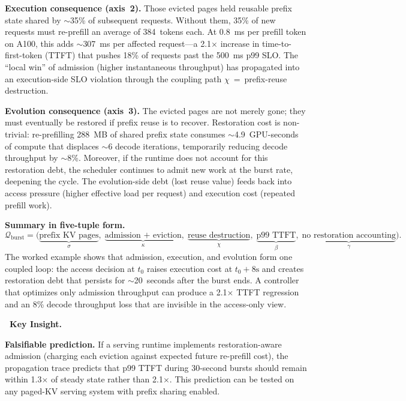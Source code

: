 \documentclass[acmsmall,screen,review]{acmart}
\newenvironment{keybox}{%
  \vspace{6pt}\noindent
  \begin{lrbox}{\keyboxcontent}
  \begin{minipage}{\dimexpr\linewidth-2\fboxsep-2\fboxrule\relax}
  \raggedright
  \textbf{\faLightbulbO\ \textcolor{keyborder}{Key Insight.}}\par\smallskip
}{%
  \end{minipage}
  \end{lrbox}
  \fcolorbox{keyborder}{keybg}{\usebox{\keyboxcontent}}%
  \vspace{6pt}%
}
\begin{document}
\smallskip\noindent\textbf{Execution consequence (axis~2).} Those evicted pages held reusable prefix state shared by $\sim$35\% of subsequent requests. Without them, 35\% of new requests must re-prefill an average of 384~tokens each. At 0.8~ms per prefill token on A100, this adds $\sim$307~ms per affected request---a 2.1$\times$ increase in time-to-first-token (TTFT) that pushes 18\% of requests past the 500~ms p99 SLO. The ``local win'' of admission (higher instantaneous throughput) has propagated into an execution-side SLO violation through the coupling path $\chi$~=~prefix-reuse destruction.

\smallskip\noindent\textbf{Evolution consequence (axis~3).} The evicted pages are not merely gone; they must eventually be restored if prefix reuse is to recover. Restoration cost is non-trivial: re-prefilling 288~MB of shared prefix state consumes $\sim$4.9~GPU-seconds of compute that displaces $\sim$6 decode iterations, temporarily reducing decode throughput by $\sim$8\%. Moreover, if the runtime does not account for this restoration debt, the scheduler continues to admit new work at the burst rate, deepening the cycle. The evolution-side debt (lost reuse value) feeds back into access pressure (higher effective load per request) and execution cost (repeated prefill work).

\smallskip\noindent\textbf{Summary in five-tuple form.}
\[
\mathcal{Q}_{\text{burst}} = \bigl(\underbrace{\text{prefix KV pages}}_{\sigma},\;\underbrace{\text{admission + eviction}}_{\kappa},\;\underbrace{\text{reuse destruction}}_{\chi},\;\underbrace{\text{p99 TTFT}}_{\beta},\;\underbrace{\text{no restoration accounting}}_{\gamma}\bigr).
\]
The worked example shows that admission, execution, and evolution form one coupled loop: the access decision at $t_0$ raises execution cost at $t_0{+}8\text{s}$ and creates restoration debt that persists for $\sim$20~seconds after the burst ends. A controller that optimizes only admission throughput can produce a 2.1$\times$ TTFT regression and an 8\% decode throughput loss that are invisible in the access-only view.

\begin{keybox}
\textbf{Falsifiable prediction.} If a serving runtime implements restoration-aware admission (charging each eviction against expected future re-prefill cost), the propagation trace predicts that p99 TTFT during 30-second bursts should remain within 1.3$\times$ of steady state rather than 2.1$\times$. This prediction can be tested on any paged-KV serving system with prefix sharing enabled.
\end{keybox}
\end{document}
